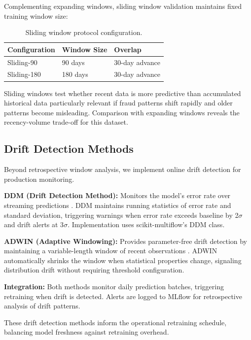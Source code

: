 Complementing expanding windows, sliding window validation maintains fixed training window size:

\begin{table}[h]
\centering
\caption{Sliding window protocol configuration.}
\begin{tabular}{lll}
\hline
Configuration & Window Size & Overlap \\
\hline
Sliding-90 & 90 days & 30-day advance \\
Sliding-180 & 180 days & 30-day advance \\
\hline
\end{tabular}
\end{table}

Sliding windows test whether recent data is more predictive than accumulated historical data particularly relevant if fraud patterns shift rapidly and older patterns become misleading. Comparison with expanding windows reveals the recency-volume trade-off for this dataset.

\subsection{Drift Detection Methods}

Beyond retrospective window analysis, we implement online drift detection for production monitoring.

\textbf{DDM (Drift Detection Method):} Monitors the model's error rate over streaming predictions \cite{gama2004learning}. DDM maintains running statistics of error rate and standard deviation, triggering warnings when error rate exceeds baseline by 2$\sigma$ and drift alerts at 3$\sigma$. Implementation uses scikit-multiflow's DDM class.

\textbf{ADWIN (Adaptive Windowing):} Provides parameter-free drift detection by maintaining a variable-length window of recent observations \cite{bifet2007learning}. ADWIN automatically shrinks the window when statistical properties change, signaling distribution drift without requiring threshold configuration.

\textbf{Integration:} Both methods monitor daily prediction batches, triggering retraining when drift is detected. Alerts are logged to MLflow for retrospective analysis of drift patterns.

These drift detection methods inform the operational retraining schedule, balancing model freshness against retraining overhead.
